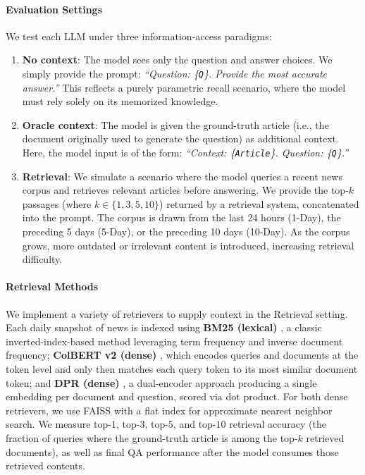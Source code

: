 \documentclass[11pt]{article}
\begin{document}
\paragraph{Evaluation Settings}
We test each LLM under three information-access paradigms:

\begin{enumerate}[label=(\roman*), leftmargin=20pt, itemsep=0pt, topsep=2pt]
    \item \textbf{No context}: The model sees only the question and answer choices. We simply provide the prompt: \emph{``Question: \{\texttt{Q}\}. Provide the most accurate answer.''} This reflects a purely parametric recall scenario, where the model must rely solely on its memorized knowledge.

    \item \textbf{Oracle context}: The model is given the ground-truth article (i.e., the document originally used to generate the question) as additional context. Here, the model input is of the form: \emph{``Context: \{\texttt{Article}\}. Question: \{\texttt{Q}\}.''} 

    \item \textbf{Retrieval}: We simulate a scenario where the model queries a recent news corpus and retrieves relevant articles before answering. We provide the top-$k$ passages (where $k \in \{1,3,5,10\}$) returned by a retrieval system, concatenated into the prompt. The corpus is drawn from the last 24 hours (1-Day), the preceding 5 days (5-Day), or the preceding 10 days (10-Day). As the corpus grows, more outdated or irrelevant content is introduced, increasing retrieval difficulty.


\end{enumerate}


\paragraph{Retrieval Methods}
We implement a variety of retrievers to supply context in the Retrieval setting. Each daily snapshot of news is indexed using \textbf{BM25 (lexical)} \citep{10.1561/1500000019}, a classic inverted-index-based method leveraging term frequency and inverse document frequency; \textbf{ColBERT v2 (dense)} \citep{santhanam2022colbertv2effectiveefficientretrieval}, which encodes queries and documents at the token level and only then matches each query token to its most similar document token;
and \textbf{DPR (dense)} \citep{karpukhin2020densepassageretrievalopendomain}, a dual-encoder approach producing a single embedding per document and question, scored via dot product. For both dense retrievers, we use FAISS \citep{douze2025faisslibrary} with a flat index for approximate nearest neighbor search. We measure top-$1$, top-$3$, top-$5$, and top-$10$ retrieval accuracy (the fraction of queries where the ground-truth article is among the top-$k$ retrieved documents), as well as final QA performance after the model consumes those retrieved contents.
\end{document}
